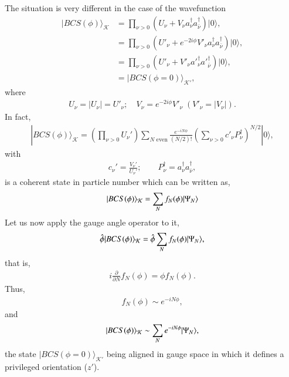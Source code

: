 The situation is very different in the case of the wavefunction
\begin{align}\label{eq3.7.7}
\nonumber|BCS(\phi)\rangle_{\mathcal{K}} &=\prod_{\nu>0}\left(U_\nu+V_\nu a_\nu^\dagger a_{\bar \nu}^{\dagger}\right)|0\rangle,\\
\nonumber&=\prod_{\nu>0}\left(U'_\nu+e^{-2i\phi}V'_\nu a^\dagger_\nu a^{\dagger}_{\bar \nu}\right)|0\rangle,\\
\nonumber&=\prod_{\nu>0}\left(U'_\nu+V'_\nu a'^\dagger_\nu a'^{\dagger}_{\bar \nu}\right)|0\rangle,\\
&=|BCS(\phi=0)\rangle_{\mathcal{K'}},
\end{align}
where 
\begin{align}
U_\nu=|U_\nu|=U'_\nu;\quad V_\nu=e^{-2i\phi}V'_\nu \;(V'_\nu=|V_\nu|).
\end{align}
In fact,
\begin{align}\label{eq3.7.19}
|BCS(\phi)\rangle_{\mathcal{K}}=\left(\prod_{\nu>0}U_\nu'\right)\sum_{N\text{ even}}\frac{e^{-iN\phi}}{(N/2)!}\left(\sum_{\nu>0}c'_\nu P^\dagger_\nu\right)^{N/2}|0\rangle,
\end{align}
with
\begin{align}
c_\nu'=\frac{V_\nu'}{U_\nu'};\quad \quad P^\dagger_\nu=a^\dagger_\nu a^\dagger_{\bar\nu},
\end{align}
is a coherent state in particle number which can be written as,
\begin{align}\label{eq3.7.21}
|{BCS(\phi)} \rangle_{\mathcal K}=\sum_N f_N(\phi)|{\Psi_N} \rangle
\end{align}
Let us now apply the gauge angle operator to it,
\begin{align}
\hat{\phi}|{BCS(\phi)} \rangle_{\mathcal K}=\hat{\phi}\sum_{N}f_N(\phi)|{\Psi_N} \rangle,
\end{align}
that is,
\begin{align}
i\frac{\partial}{\partial N}f_N(\phi)=\phi f_N(\phi).
\end{align}
Thus,
\begin{align}
f_N(\phi)\sim e^{-iN\phi},
\end{align}
and
\begin{align}
|{BCS(\phi)} \rangle_{\mathcal K}\sim \sum_{N} e^{-iN\phi}|{\Psi_N} \rangle,
\end{align}
 the state $|BCS(\phi=0)\rangle_{\mathcal{K}'}$ being aligned in gauge space in which it defines a privileged orientation ($z'$).


